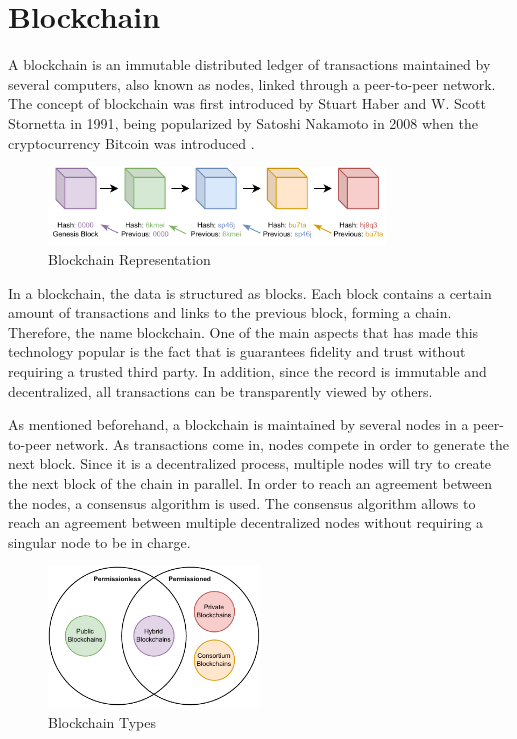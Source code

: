 \section{Blockchain}
\label{preliminaries:blockchain}

A blockchain is an immutable distributed ledger of transactions maintained by several computers, also known as nodes, linked through a peer-to-peer network. The concept of blockchain was first introduced by Stuart Haber and W. Scott Stornetta in 1991\cite{10.48550/ARXIV.1810.06130}, being popularized by Satoshi Nakamoto in 2008 when the cryptocurrency Bitcoin was introduced \cite{nakamoto2009bitcoin}.

\begin{figure}[h]
    \centering
    \includegraphics[width=0.8\textwidth]{graphics/blockchain.pdf}
    \caption{Blockchain Representation}
    \label{fig:blockchain_blocks}
\end{figure}

In a blockchain, the data is structured as blocks. Each block contains a certain amount of transactions and links to the previous block, forming a chain. Therefore, the name blockchain. One of the main aspects that has made this technology popular is the fact that is guarantees fidelity and trust without requiring a trusted third party. In addition, since the record is immutable and decentralized, all transactions can be transparently viewed by others.

As mentioned beforehand, a blockchain is maintained by several nodes in a peer-to-peer network. As transactions come in, nodes compete in order to generate the next block. Since it is a decentralized process, multiple nodes will try to create the next block of the chain in parallel. In order to reach an agreement between the nodes, a consensus algorithm is used. The consensus algorithm allows to reach an agreement between multiple decentralized nodes without requiring a singular node to be in charge.

\begin{figure}[h]
    \centering
    \includegraphics[width=0.5\textwidth]{graphics/blockchain-types.pdf}
    \caption{Blockchain Types}
    \label{fig:blockchain_types}
\end{figure}

